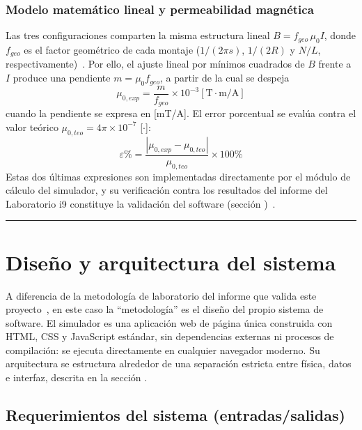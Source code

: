 \documentclass{article}
\begin{document}
\subsubsection{Modelo matemático lineal y permeabilidad magnética}

Las tres configuraciones comparten la misma estructura lineal $B = f_{geo}\, \mu_0 I$, donde $f_{geo}$ es el factor geométrico de cada montaje ($1/(2\pi s)$, $1/(2R)$ y $N/L$, respectivamente)~\cite{labi9rep}. Por ello, el ajuste lineal por mínimos cuadrados de $B$ frente a $I$ produce una pendiente $m = \mu_0 f_{geo}$, a partir de la cual se despeja
\begin{equation}
    \mu_{0,exp} = \frac{m}{f_{geo}} \times 10^{-3}\left[\text{T}\cdot\text{m/A}\right]
    \label{eq:mu0}
\end{equation}
cuando la pendiente se expresa en [mT/A]. El error porcentual se evalúa contra el valor teórico $\mu_{0,teo} = 4\pi \times 10^{-7}$ [$\cdot$]:
\begin{equation}
    \varepsilon\% = \frac{|\mu_{0,exp} - \mu_{0,teo}|}{\mu_{0,teo}} \times 100\%
    \label{eq:error}
\end{equation}
Estas dos últimas expresiones son implementadas directamente por el módulo de cálculo del simulador, y su verificación contra los resultados del informe del Laboratorio i9 constituye la validación del software (sección )~\cite{labi9rep}.

\vspace{2em}
\hrule
\vspace{1em}

\section{Diseño y arquitectura del sistema} \label{sec:diseno}

A diferencia de la metodología de laboratorio del informe que valida este proyecto~\cite{labi9rep}, en este caso la ``metodología'' es el diseño del propio sistema de software. El simulador es una aplicación web de página única construida con HTML, CSS y JavaScript estándar, sin dependencias externas ni procesos de compilación: se ejecuta directamente en cualquier navegador moderno. Su arquitectura se estructura alrededor de una separación estricta entre física, datos e interfaz, descrita en la sección .

\subsection{Requerimientos del sistema (entradas/salidas)} \label{sec:requerimientos}
\end{document}
